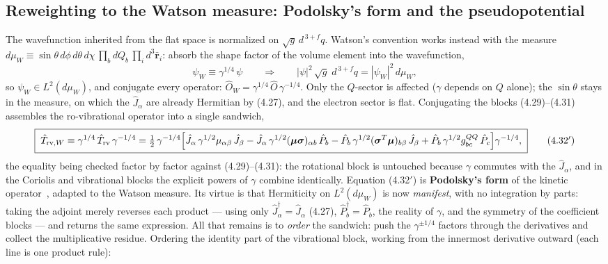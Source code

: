 \subsection{Reweighting to the Watson measure: Podolsky's form and the pseudopotential}

The wavefunction inherited from the flat space is normalized on $\sqrt g\,d^{\,3+f}q$. Watson's convention works instead with the measure $d\mu_W\equiv\sin\theta\,d\phi\,d\theta\,d\chi\,\prod_bdQ_b\,\prod_id^3\bar{\mathbf r}_i$: absorb the shape factor of the volume element into the wavefunction,
\begin{equation}
\psi_W\equiv\gamma^{1/4}\,\psi
\qquad\Longrightarrow\qquad
|\psi|^{2}\,\sqrt g\;d^{\,3+f}q=|\psi_W|^{2}\,d\mu_W , \tag{4.32}
\end{equation}
so $\psi_W\in L^{2}(d\mu_W)$, and conjugate every operator: $\hat O_W=\gamma^{1/4}\,\hat O\,\gamma^{-1/4}$. Only the $Q$-sector is affected ($\gamma$ depends on $Q$ alone); the $\sin\theta$ stays in the measure, on which the $\hat J_\alpha$ are already Hermitian by (4.27), and the electron sector is flat. Conjugating the blocks (4.29)--(4.31) assembles the ro-vibrational operator into a single sandwich,
\begin{equation}
\boxed{\;\hat T_{\mathrm{rv},W}\equiv\gamma^{1/4}\,\hat T_{\mathrm{rv}}\,\gamma^{-1/4}
=\tfrac12\,\gamma^{-1/4}\Bigl[\hat J_\alpha\,\gamma^{1/2}\mu_{\alpha\beta}\,\hat J_\beta
-\hat J_\alpha\,\gamma^{1/2}(\boldsymbol\mu\boldsymbol\sigma)_{\alpha b}\,\hat P_b
-\hat P_b\,\gamma^{1/2}(\boldsymbol\sigma^{T}\boldsymbol\mu)_{b\beta}\,\hat J_\beta
+\hat P_b\,\gamma^{1/2}g^{QQ}_{bc}\,\hat P_c\Bigr]\gamma^{-1/4},\;}\tag{4.32$'$}
\end{equation}
the equality being checked factor by factor against (4.29)--(4.31): the rotational block is untouched because $\gamma$ commutes with the $\hat J_\alpha$, and in the Coriolis and vibrational blocks the explicit powers of $\gamma$ combine identically. Equation (4.32$'$) is \textbf{Podolsky's form} of the kinetic operator~\cite{podolsky1928}, adapted to the Watson measure. Its virtue is that Hermiticity on $L^{2}(d\mu_W)$ is now \emph{manifest}, with no integration by parts: taking the adjoint merely reverses each product --- using only $\hat J_\alpha^{\dagger}=\hat J_\alpha$ (4.27), $\hat P_b^{\dagger}=\hat P_b$, the reality of $\gamma$, and the symmetry of the coefficient blocks --- and returns the same expression. All that remains is to \emph{order} the sandwich: push the $\gamma^{\pm1/4}$ factors through the derivatives and collect the multiplicative residue. Ordering the identity part of the vibrational block, working from the innermost derivative outward (each line is one product rule):
